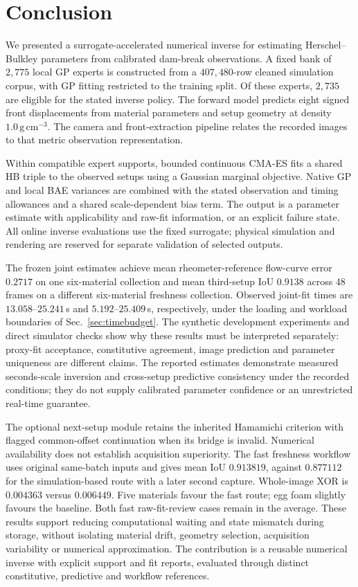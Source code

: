 \section{Conclusion}
\label{sec:conclusion}

We presented a surrogate-accelerated numerical inverse for estimating
Herschel--Bulkley parameters from calibrated dam-break observations.
A fixed bank of $2{,}775$ local GP experts is constructed from a
$407{,}480$-row cleaned simulation corpus, with GP fitting restricted
to the training split. Of these experts, $2{,}735$ are eligible for
the stated inverse policy. The forward model predicts eight signed
front displacements from material parameters and setup geometry at
density $1.0\,\mathrm{g\,cm}^{-3}$. The camera and front-extraction
pipeline relates the recorded images to that metric observation
representation.

Within compatible expert supports, bounded continuous CMA-ES fits a
shared HB triple to the observed setups using a Gaussian marginal
objective. Native GP and local BAE variances are combined with the
stated observation and timing allowances and a shared scale-dependent
bias term. The output is a parameter estimate with applicability and
raw-fit information, or an explicit failure state. All online
inverse evaluations use the fixed surrogate; physical simulation and
rendering are reserved for separate validation of selected outputs.

The frozen joint estimates achieve mean rheometer-reference
flow-curve error $0.2717$ on one six-material collection and mean
third-setup IoU $0.9138$ across 48 frames on a different six-material
freshness collection. Observed joint-fit times are
$13.058$--$25.241$\,s and $5.192$--$25.409$\,s, respectively,
under the loading and workload boundaries of
Sec.~\ref{sec:timebudget}. The synthetic development experiments and
direct simulator checks show why these results must be interpreted
separately: proxy-fit acceptance, constitutive agreement, image
prediction and parameter uniqueness are different claims. The
reported estimates demonstrate measured seconds-scale inversion and
cross-setup predictive consistency under the recorded conditions;
they do not supply calibrated parameter confidence or an unrestricted
real-time guarantee.

The optional next-setup module retains the inherited Hamamichi
criterion with flagged common-offset continuation when its bridge is
invalid. Numerical availability does not establish acquisition superiority.
The fast freshness workflow uses original same-batch inputs and gives
mean IoU $0.913819$, against $0.877112$ for the simulation-based route
with a later second capture. Whole-image XOR is $0.004363$
versus $0.006449$. Five materials favour the fast route; egg foam
slightly favours the baseline. Both fast raw-fit-review cases remain
in the average. These results support reducing computational waiting
and state mismatch during storage, without isolating material drift,
geometry selection, acquisition variability or numerical approximation.
The contribution is a reusable numerical inverse with explicit support
and fit reports, evaluated through distinct constitutive, predictive
and workflow references.


